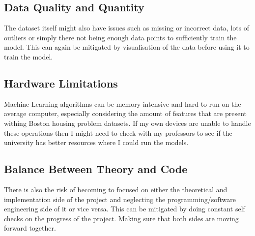 \subsection{Data Quality and Quantity}

The dataset itself might also have issues such as missing or incorrect data, lots of outliers or simply there not being enough data points to sufficiently train the model. This can again be mitigated by visualisation of the data before using it to train the model.

\subsection{Hardware Limitations}

Machine Learning algorithms can be memory intensive and hard to run on the average computer, especially considering the amount of features that are present withing Boston housing problem datasets. If my own devices are unable to handle these operations then I might need to check with my professors to see if the university has better resources where I could run the models.

\subsection{Balance Between Theory and Code}

There is also the risk of becoming to focused on either the theoretical and implementation side of the project and neglecting the programming/software engineering side of it or vice versa. This can be mitigated by doing constant self checks on the progress of the project. Making sure that both sides are moving forward together.
